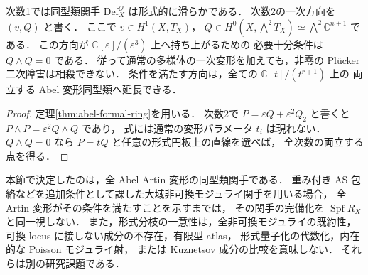 \begin{corollary}[一次方向と二次障害]
\label{cor:abel-quadratic-obstruction}
次数1では同型類関手 $\mathrm{Def}^{\mathcal O}_X$ は形式的に滑らかである．
次数2の一次方向を $(v,Q)$ と書く．
ここで $v\in H^1(X,T_X)$，
$Q\in H^0(X,\bigwedge^2T_X)\simeq\bigwedge^2\mathbb C^{n+1}$ である．
この方向が $\mathbb C[\varepsilon]/(\varepsilon^3)$ 上へ持ち上がるための
必要十分条件は $Q\wedge Q=0$ である．
従って通常の多様体の一次変形を加えても，非零の Pl\"ucker 二次障害は相殺できない．
条件を満たす方向は，全ての $\mathbb C[t]/(t^{r+1})$ 上の
両立する Abel 変形同型類へ延長できる．
\end{corollary}
\begin{proof}
定理\ref{thm:abel-formal-ring}を用いる．
次数2で $P=\varepsilon Q+\varepsilon^2Q_2$ と書くと
$P\wedge P=\varepsilon^2Q\wedge Q$ であり，
式には通常の変形パラメータ $t_i$ は現れない．
$Q\wedge Q=0$ なら $P=tQ$ と任意の形式円板上の直線を選べば，
全次数の両立する点を得る．
\end{proof}

\begin{remark}[形式的な結果と大域モジュライ]
本節で決定したのは，全 Abel Artin 変形の同型類関手である．
重み付き AS 包絡などを追加条件として課した大域非可換モジュライ関手を用いる場合，
全 Artin 変形がその条件を満たすことを示すまでは，
その関手の完備化を $\operatorname{Spf}R_X$ と同一視しない．
また，形式分枝の一意性は，全非可換モジュライの既約性，
可換 locus に接しない成分の不存在，有限型 atlas，
形式量子化の代数化，内在的な Poisson モジュライ射，
または Kuznetsov 成分の比較を意味しない．
それらは別の研究課題である．
\end{remark}
\par
